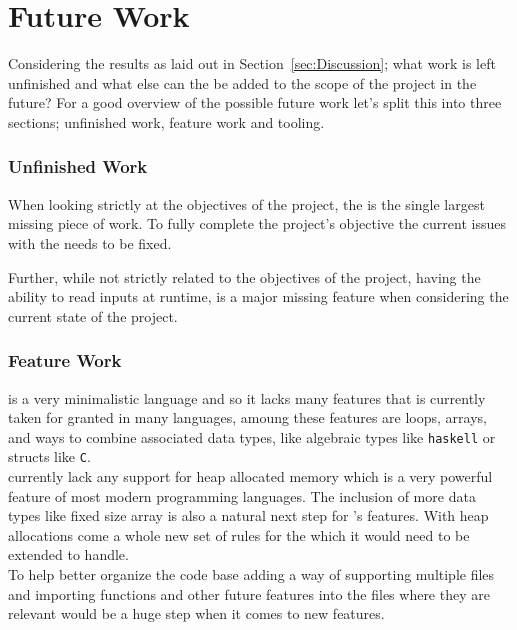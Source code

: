 \section{Future Work}
\label{sec:FutureWork}

Considering the results as laid out in Section~\ref{sec:Discussion}; what work is left
unfinished and what else can the be added to the scope of the project in the future?
For a good overview of the possible future work let's split this into three sections;
unfinished work, feature work and tooling.

\subsubsection{Unfinished Work}
\label{sec:unfinished}

When looking strictly at the objectives of the project, the \borrowChecker{} is the
single largest missing piece of work. To fully complete the project's objective the
current issues with the \borrowChecker{} needs to be fixed. 

Further, while not strictly related to the objectives of the project, having the
ability to read inputs at runtime, is a major missing feature when considering the
current state of the project.

\subsubsection{Feature Work}
\label{sec:feature}

\lang{} is a very minimalistic language and so it lacks many features that is
currently taken for granted in many languages, amoung these features are loops,
arrays, and ways to combine associated data types, like algebraic types like
\texttt{haskell} or structs like \texttt{C}.\\

\lang{} currently lack any support for heap allocated memory which is a very powerful
feature of most modern programming languages. The inclusion of more data types like
fixed size array is also a natural next step for \lang's features. With heap
allocations come a whole new set of rules for the \borrowChecker{} which it would
need to be extended to handle. \\

To help better organize the code base adding a way of supporting multiple files and
importing functions and other future features into the files where they are relevant
would be a huge step when it comes to new features. \\

